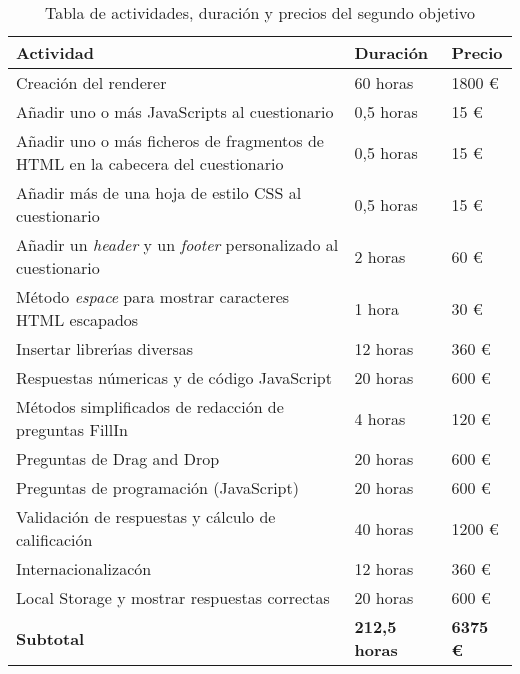 \begin{table}[!ht]
\begin{center}
\begin{tabular}{|p{80mm}|p{25mm}|p{20mm}|} \hline 
\textbf{Actividad} & \textbf{Duraci\'on} & \textbf{Precio} \\ \hline

Creaci\'on del renderer &
60 horas &
1800 \euro{}
\\
\hline

A\~{n}adir uno o m\'as JavaScripts al cuestionario &
0,5 horas &
15 \euro{}
\\
\hline

A\~{n}adir uno o m\'as ficheros de fragmentos de HTML en la cabecera del cuestionario &
0,5 horas &
15 \euro{}
\\
\hline

A\~{n}adir m\'as de una hoja de estilo CSS al cuestionario &
0,5 horas &
15 \euro{}
\\
\hline

A\~{n}adir un \textit{header} y un \textit{footer} personalizado al cuestionario &
2 horas &
60 \euro{}
\\
\hline

M\'etodo \textit{espace} para mostrar caracteres HTML escapados &
1 hora &
30 \euro{}
\\
\hline

Insertar librer\'{\i}as diversas &
12 horas &
360 \euro{}
\\
\hline

Respuestas n\'umericas y de c\'odigo JavaScript &
20 horas &
600 \euro{}
\\
\hline

M\'etodos simplificados de redacci\'on de preguntas FillIn &
4 horas &
120 \euro{}
\\
\hline

Preguntas de Drag and Drop &
20 horas &
600 \euro{}
\\
\hline

Preguntas de programaci\'on (JavaScript) &
20 horas &
600 \euro{}
\\
\hline

Validaci\'on de respuestas y c\'alculo de calificaci\'on &
40 horas &
1200 \euro{}
\\
\hline

Internacionalizac\'on &
12 horas &
360 \euro{}
\\
\hline

Local Storage y mostrar respuestas correctas &
20 horas &
600 \euro{}
\\
\hline \hline

{\bfseries Subtotal} &
{\bfseries 212,5 horas} &
{\bfseries 6375 \euro{}}
\\
\hline

\end{tabular}
\end{center}
\caption{Tabla de actividades, duraci\'on y precios del segundo objetivo}
\label{table:resOthers2}
\end{table}
